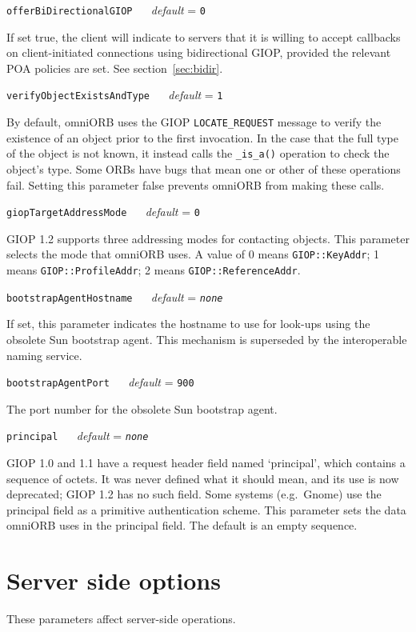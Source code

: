 \documentclass[11pt,twoside,a4paper]{book}
\makeatletter
\newcommand{\code}[1]{\texttt{#1}}
\newcommand{\op}[1]{\texttt{#1()}}
\newcommand{\confopt}[2]
  {\vspace{\baselineskip}\par\noindent\code{#1} ~~ \textit{default} =
   \code{#2}}
\renewcommand{\confopt}[2]
  {\vspace{\baselineskip}\par\noindent\code{#1} ~~ \textit{default} =
   \code{#2}\\[-1ex]\@afterheading}
\makeatother
\begin{document}
\confopt{offerBiDirectionalGIOP}{0}

If set true, the client will indicate to servers that it is willing to
accept callbacks on client-initiated connections using bidirectional
GIOP, provided the relevant POA policies are set. See
section~\ref{sec:bidir}.


\confopt{verifyObjectExistsAndType}{1}

By default, omniORB uses the GIOP \code{LOCATE\_REQUEST} message to
verify the existence of an object prior to the first invocation. In
the case that the full type of the object is not known, it instead
calls the \op{\_is\_a} operation to check the object's type. Some ORBs
have bugs that mean one or other of these operations fail. Setting
this parameter false prevents omniORB from making these calls.


\confopt{giopTargetAddressMode}{0}

GIOP 1.2 supports three addressing modes for contacting objects. This
parameter selects the mode that omniORB uses. A value of 0 means
\code{GIOP::KeyAddr}; 1 means \code{GIOP::ProfileAddr}; 2 means
\code{GIOP::ReferenceAddr}.


\confopt{bootstrapAgentHostname}{\textit{none}}

If set, this parameter indicates the hostname to use for look-ups
using the obsolete Sun bootstrap agent. This mechanism is superseded
by the interoperable naming service.


\confopt{bootstrapAgentPort}{900}

The port number for the obsolete Sun bootstrap agent.


\confopt{principal}{\textit{none}}

GIOP 1.0 and 1.1 have a request header field named `principal', which
contains a sequence of octets. It was never defined what it should
mean, and its use is now deprecated; GIOP 1.2 has no such field. Some
systems (e.g.\ Gnome) use the principal field as a primitive
authentication scheme. This parameter sets the data omniORB uses in
the principal field. The default is an empty sequence.



\section{Server side options}

These parameters affect server-side operations.


\vspace{\baselineskip}
\end{document}
